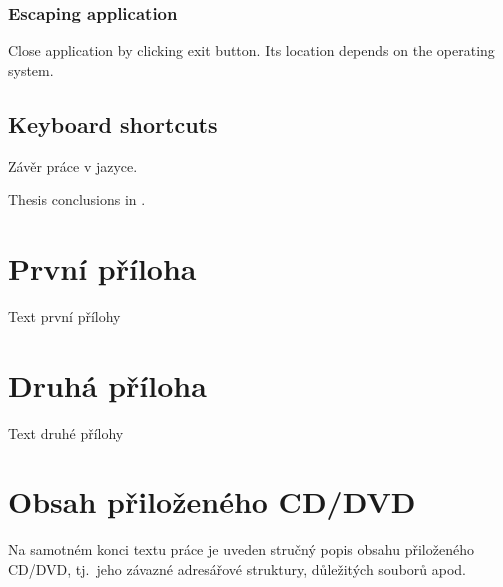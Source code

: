 \documentclass[
  field=inf,
  biblatex,
  language=english,
  glossaries,
  theorems=false,
  index
]{kidiplom}
\begin{document}
\subsubsection{Escaping application}

Close application by clicking exit button. Its location depends on the operating system.

\subsection{Keyboard shortcuts}

\begin{kiconclusions}
Závěr práce v  jazyce.
\end{kiconclusions}

\begin{kiconclusions}[english]
Thesis conclusions in .
\end{kiconclusions}

\appendix

\section{První příloha}
Text první přílohy

\section{Druhá příloha}
Text druhé přílohy

\section{Obsah přiloženého CD/DVD} \label{sec:ObsahCD}

Na samotném konci textu práce je uveden stručný popis obsahu
přiloženého CD/DVD, tj.~jeho závazné adresářové struktury, důležitých
souborů apod.
\end{document}
